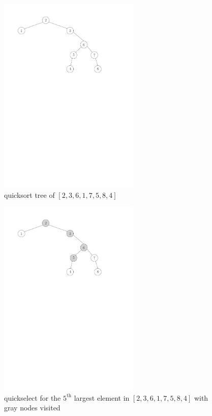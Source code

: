 \begin{figure}[htpb]
    \centering
    \includegraphics[width=0.6\textwidth]{qsort.pdf}
    \caption{quicksort tree of $[2,3,6,1,7,5,8,4]$}
\end{figure}
\begin{figure}[htpb]
    \centering
    \includegraphics[width=0.6\textwidth]{qselect.pdf}
    \caption{quickselect for the $5^\text{th}$ largest element in $[2,3,6,1,7,5,8,4]$ with gray nodes visited}
\end{figure}

